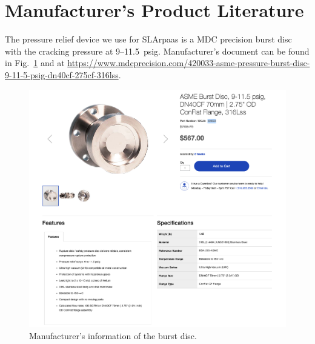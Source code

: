 \section{Manufacturer's Product Literature}
\label{app:manufacturer}

The pressure relief device we use for SLArpaas is a MDC precision 
burst disc with the cracking pressure at 9--11.5~psig.
Manufacturer's document can be found in Fig.~\ref{fig:mdc_burst_disc} and at
\url{https://www.mdcprecision.com/420033-asme-pressure-burst-disc-9-11-5-psig-dn40cf-275cf-316lss}.

\begin{figure}[h]
    \centering
    \includegraphics[width=0.75\textheight]{fig/MDC_BurstDisc.png}
    \caption{Manufacturer's information of the burst disc.}
    \label{fig:mdc_burst_disc}
\end{figure}